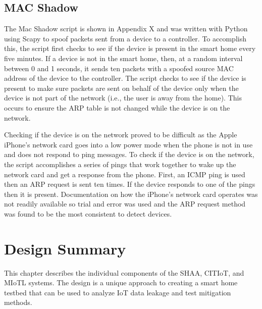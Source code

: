 \documentclass[12pt,letterpaper,oneside]{book}
\begin{document}
			\subsection{MAC Shadow}
			The Mac Shadow script is shown in Appendix X and was written with Python using Scapy to spoof packets sent from a device to a controller. To accomplish this, the script first checks to see if the device is present in the smart home every five minutes. If a device is not in the smart home, then, at a random interval between 0 and 1 seconds, it sends ten packets with a spoofed source \ac{MAC} address of the device to the controller. The script checks to see if the device is present to make sure packets are sent on behalf of the device only when the device is not part of the network (i.e., the user is away from the home). This occurs to ensure the \ac{ARP} table is not changed while the device is on the network.
			
			Checking if the device is on the network proved to be difficult as the Apple iPhone's network card goes into a low power mode when the phone is not in use and does not respond to ping messages. To check if the device is on the network, the script accomplishes a series of pings that work together to wake up the network card and get a response from the phone. First, an ICMP ping is used then an \ac{ARP} request is sent ten times. If the device responds to one of the pings then it is present. Documentation on how the iPhone's network card operates was not readily available so trial and error was used and the \ac{ARP} request method was found to be the most consistent to detect devices.
			
			
		\done{}
		
		\section{Design Summary}
		This chapter describes the individual components of the \ac{SHAA}, \ac{CITIoT}, and \ac{MIoTL} systems. The design is a unique approach to creating a smart home testbed that can be used to analyze \ac{IoT} data leakage and test mitigation methods. 

	\todos
\backmatter
	\singlespace
	
	 
	\clearpage
\end{document}
